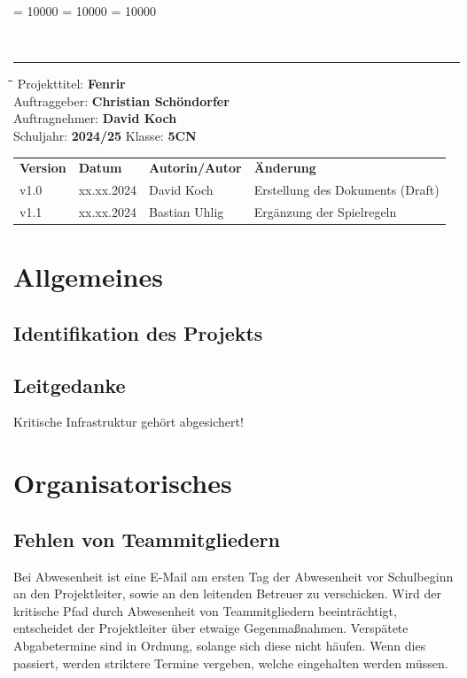 \documentclass[
	headings=optiontotocandhead,%
	oneside,
	numbers=noenddot,%
	toc=flat, %
	10pt, %
	parskip=full, %
	listof=totoc, %
	listof=flat, %
	numbers=noenddot, %
	bibliography=totoc, %
	a4paper,DIV=14,
]{scrartcl}
\newcommand\Tstrut{\rule{0pt}{3.2ex}}         %
\newcommand\Bstrut{\rule[-1.5ex]{0pt}{0pt}}   %
\newenvironment{nstabbing}
	{\setlength{\topsep}{-\parskip}
		\setlength{\partopsep}{-\parskip}
		\tabbing}
	{\endtabbing}
\begin{document}
\clubpenalty = 10000 %
\widowpenalty = 10000 %
\displaywidowpenalty = 10000

{\sffamily{\textbf{\LARGE{\textcolor{orange}{Spielregeln}}}}}\\
\noindent\rule{\textwidth}{0.1pt}
\begin{nstabbing}
	\hspace{4cm}\=\hspace{4cm}\=\hspace{4cm}\=\kill
	Projekttitel: \> \textbf{Fenrir}\\
	Auftraggeber: \> \textbf{Christian Schöndorfer}\\
	Auftragnehmer: \> \textbf{David Koch}\\
	Schuljahr: \> \textbf{2024/25}
	\> Klasse: \> \textbf{5CN}\\
\end{nstabbing}
{\smaller
	\begin{tabularx}{\textwidth}{l l l l}
	\hline
	\textbf{Version} & \textbf{Datum} & \textbf{Autorin/Autor} & \textbf{Änderung}\Tstrut  \\
	v1.0 & xx.xx.2024 & David Koch & Erstellung des Dokuments (Draft)\Tstrut  \\
	v1.1 & xx.xx.2024 & Bastian Uhlig & Ergänzung der Spielregeln \Bstrut \\
	\hline
	\end{tabularx}
}

\section{Allgemeines}
\subsection{Identifikation des Projekts}
\blindtext
\subsection{Leitgedanke}
Kritische Infrastruktur gehört abgesichert!


\section{Organisatorisches}
\subsection{Fehlen von Teammitgliedern}
Bei Abwesenheit ist eine E-Mail am ersten Tag der Abwesenheit vor Schulbeginn an den Projektleiter, sowie an den leitenden Betreuer zu verschicken. Wird der kritische Pfad durch Abwesenheit von Teammitgliedern beeinträchtigt, entscheidet der Projektleiter über etwaige Gegenmaßnahmen. Verspätete Abgabetermine sind in Ordnung, solange sich diese nicht häufen. Wenn dies passiert, werden striktere Termine vergeben, welche eingehalten werden müssen.
\end{document}
